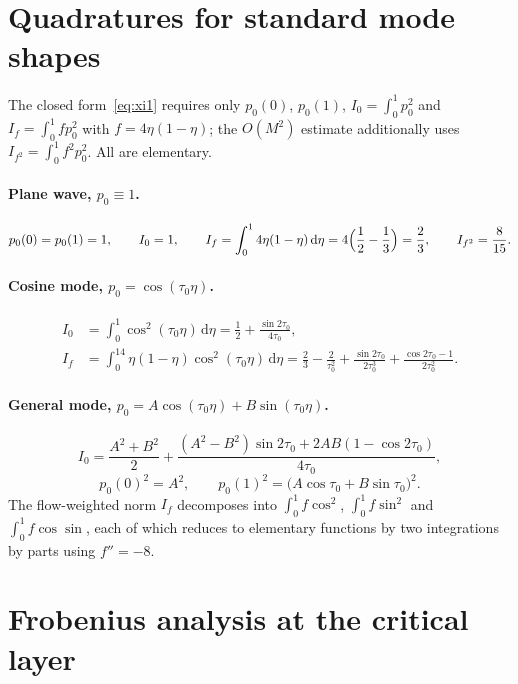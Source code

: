 \documentclass[11pt,a4paper]{article}
\newcommand{\dd}{\mathrm{d}}
\theoremstyle{plain}
\theoremstyle{remark}
\begin{document}
\section{Quadratures for standard mode shapes}\label{app:integrals}

The closed form~\eqref{eq:xi1} requires only $p_0(0)$, $p_0(1)$, $I_0=\int_0^1p_0^2$ and
$I_f=\int_0^1fp_0^2$ with $f=4\eta(1-\eta)$; the $O(M^2)$ estimate additionally uses
$I_{f^2}=\int_0^1f^2p_0^2$. All are elementary.

\paragraph{Plane wave, $p_0\equiv1$.}
\begin{equation}
p_0(0)=p_0(1)=1,\qquad I_0=1,\qquad
I_f=\int_0^14\eta(1-\eta)\,\dd\eta=4\Bigl(\frac12-\frac13\Bigr)=\frac23,\qquad
I_{f^2}=\frac{8}{15}.
\end{equation}

\paragraph{Cosine mode, $p_0=\cos(\tau_0\eta)$.}
\begin{align}
I_0&=\int_0^1\cos^2(\tau_0\eta)\,\dd\eta=\frac12+\frac{\sin2\tau_0}{4\tau_0},\\
I_f&=\int_0^14\eta(1-\eta)\cos^2(\tau_0\eta)\,\dd\eta
=\frac23-\frac{2}{\tau_0^2}+\frac{\sin2\tau_0}{2\tau_0^3}+\frac{\cos2\tau_0-1}{2\tau_0^2}.
\end{align}

\paragraph{General mode, $p_0=A\cos(\tau_0\eta)+B\sin(\tau_0\eta)$.}
\begin{equation}
I_0=\frac{A^2+B^2}{2}+\frac{(A^2-B^2)\sin2\tau_0+2AB(1-\cos2\tau_0)}{4\tau_0},
\end{equation}
\begin{equation}
p_0(0)^2=A^2,\qquad p_0(1)^2=\bigl(A\cos\tau_0+B\sin\tau_0\bigr)^2 .
\end{equation}
The flow-weighted norm $I_f$ decomposes into $\int_0^1f\cos^2$, $\int_0^1f\sin^2$ and
$\int_0^1f\cos\sin$, each of which reduces to elementary functions by two integrations by parts using
$f''=-8$.

\section{Frobenius analysis at the critical layer}\label{app:frobenius}
\end{document}
